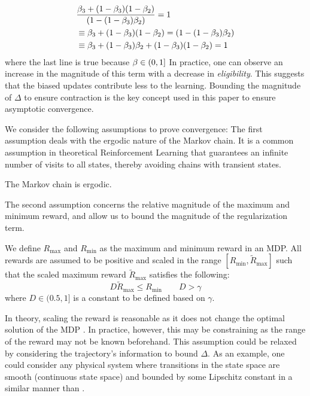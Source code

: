 \begin{equation}
    \begin{split}
        & \frac{\beta_3  + (1-\beta_3)(1-\beta_2)  }{(1-(1-\beta_3)\beta_2)} = 1 \\
        &\equiv \beta_3  + (1-\beta_3)(1-\beta_2)  = (1-(1-\beta_3)\beta_2) \\
        &\equiv \beta_3 + (1-\beta_3)\beta_2 + (1-\beta_3)(1-\beta_2) = 1
    \end{split}
\end{equation}
where the last line is true because $\beta \in (0,1]$
In practice, one can observe an increase in the magnitude of this term with a decrease in \emph{eligibility}. This suggests that the biased updates contribute less to the learning. Bounding the magnitude of $\Delta$ to ensure contraction is the key concept used in this paper to ensure asymptotic convergence.

We consider the following assumptions to prove convergence:
The first assumption deals with the ergodic nature of the Markov chain. It is a common assumption in theoretical Reinforcement Learning that guarantees an infinite number of visits to all states, thereby avoiding chains with transient states.
\begin{assumption}
The Markov chain is ergodic.
\end{assumption}


The second assumption concerns the relative magnitude of the maximum and minimum reward, and allow us to bound the magnitude of the regularization term. 
\begin{assumption}
\label{assumption_rew}
We define $R_{\max}$ and $R_{\min}$ as the maximum and minimum reward in an MDP. All rewards are assumed to be positive and scaled in the range $[R_{\min},\widetilde{R}_{\max}]$ such that the scaled maximum reward $\widetilde{R}_{\max}$ satisfies the following:
\begin{equation}
    D\widetilde{R}_{\text{max}}  \leq R_{\text{min}} \qquad  D > \gamma 
\end{equation}
where $D \in (0.5,1]$ is a constant to be defined based on $\gamma$.
\end{assumption}
In theory, scaling the reward is reasonable as it does not change the optimal solution of the MDP \citep{van2016learning}. In practice, however, this may be constraining as the range of the reward may not be known beforehand. This assumption could be relaxed by considering the trajectory's information to bound $\Delta$. As an example, one could consider any physical system where transitions in the state space are smooth (continuous state space) and bounded by some Lipschitz constant in a similar manner than \citep{shah2018q}. 

